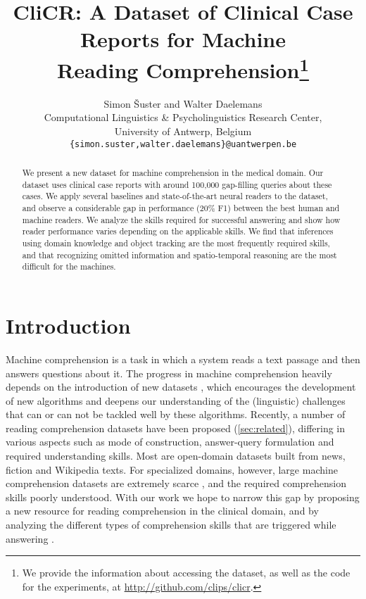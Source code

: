 \documentclass[11pt,a4paper]{article}
\title{CliCR: A Dataset of Clinical Case Reports for Machine\\ Reading Comprehension\thanks{We provide the information about accessing the dataset, as well as the code for the experiments, at \url{http://github.com/clips/clicr}.}}
\author{Simon \v{S}uster \textnormal{and} Walter Daelemans\\
  Computational Linguistics \& Psycholinguistics Research Center,\\ University of Antwerp, Belgium \\
  {\tt \{simon.suster,walter.daelemans\}@uantwerpen.be}}
\date{}
\begin{document}
\maketitle
\begin{abstract}
We present a new dataset for machine comprehension in the medical domain. Our dataset uses clinical case reports with around 100,000 gap-filling queries about these cases. We apply several baselines and state-of-the-art neural readers to the dataset, and observe a considerable gap in performance (20\% F1) between the best human and machine readers. We analyze the skills required for successful answering and show how reader performance varies depending on the applicable skills. We find that inferences using domain knowledge and object tracking are the most frequently required skills, and that recognizing omitted information and spatio-temporal reasoning are the most difficult for the machines.

\end{abstract}

\section{Introduction}
Machine comprehension is a task in which a system reads a text passage and then answers questions about it. The progress in machine comprehension heavily depends on the introduction of new datasets \citep{Burges2013}, which encourages the development of new algorithms and deepens our understanding of the (linguistic) challenges that can or can not be tackled well by these algorithms.  Recently, a number of reading comprehension datasets have been proposed (\autoref{sec:related}), differing in various aspects such as mode of construction, answer-query formulation and required understanding skills. Most are open-domain datasets built from news, fiction and Wikipedia texts. For specialized domains, however, large machine comprehension datasets are extremely scarce \citep{WelblEtAl2017}, and the required comprehension skills poorly understood. With our work we hope to narrow this gap by proposing a new resource for reading comprehension in the clinical domain, and by analyzing the different types of comprehension skills that are triggered while answering \citep{SugawaraEtAl2017a,LaiEtAl2017}.
\end{document}
